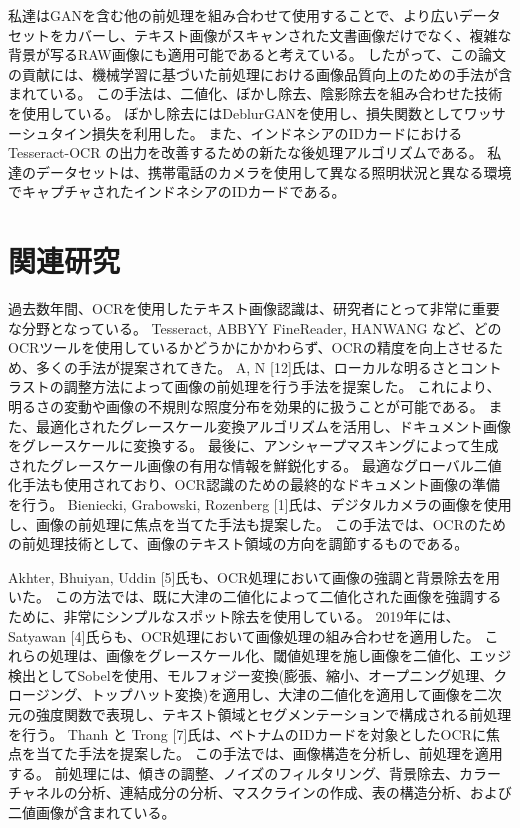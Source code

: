 \documentclass[uplatex, twocolumn,10pt]{jsarticle}
\begin{document}
私達はGANを含む他の前処理を組み合わせて使用することで、より広いデータセットをカバーし、テキスト画像がスキャンされた文書画像だけでなく、複雑な背景が写るRAW画像にも適用可能であると考えている。
したがって、この論文の貢献には、機械学習に基づいた前処理における画像品質向上のための手法が含まれている。
この手法は、二値化、ぼかし除去、陰影除去を組み合わせた技術を使用している。
ぼかし除去にはDeblurGANを使用し、損失関数としてワッサーシュタイン損失を利用した。
また、インドネシアのIDカードにおける Tesseract-OCR の出力を改善するための新たな後処理アルゴリズムである。
私達のデータセットは、携帯電話のカメラを使用して異なる照明状況と異なる環境でキャプチャされたインドネシアのIDカードである。



\section{関連研究}

過去数年間、OCRを使用したテキスト画像認識は、研究者にとって非常に重要な分野となっている。
Tesseract, ABBYY FineReader, HANWANG など、どのOCRツールを使用しているかどうかにかかわらず、OCRの精度を向上させるため、多くの手法が提案されてきた。
A, N [12]氏は、ローカルな明るさとコントラストの調整方法によって画像の前処理を行う手法を提案した。
これにより、明るさの変動や画像の不規則な照度分布を効果的に扱うことが可能である。
また、最適化されたグレースケール変換アルゴリズムを活用し、ドキュメント画像をグレースケールに変換する。
最後に、アンシャープマスキングによって生成されたグレースケール画像の有用な情報を鮮鋭化する。
最適なグローバル二値化手法も使用されており、OCR認識のための最終的なドキュメント画像の準備を行う。
Bieniecki, Grabowski, Rozenberg [1]氏は、デジタルカメラの画像を使用し、画像の前処理に焦点を当てた手法も提案した。
この手法では、OCRのための前処理技術として、画像のテキスト領域の方向を調節するものである。

Akhter, Bhuiyan, Uddin [5]氏も、OCR処理において画像の強調と背景除去を用いた。
この方法では、既に大津の二値化によって二値化された画像を強調するために、非常にシンプルなスポット除去を使用している。
2019年には、Satyawan [4]氏らも、OCR処理において画像処理の組み合わせを適用した。
これらの処理は、画像をグレースケール化、閾値処理を施し画像を二値化、エッジ検出としてSobelを使用、モルフォジー変換(膨張、縮小、オープニング処理、クロージング、トップハット変換)を適用し、大津の二値化を適用して画像を二次元の強度関数で表現し、テキスト領域とセグメンテーションで構成される前処理を行う。
Thanh と Trong [7]氏は、ベトナムのIDカードを対象としたOCRに焦点を当てた手法を提案した。
この手法では、画像構造を分析し、前処理を適用する。
前処理には、傾きの調整、ノイズのフィルタリング、背景除去、カラーチャネルの分析、連結成分の分析、マスクラインの作成、表の構造分析、および二値画像が含まれている。
\end{document}
